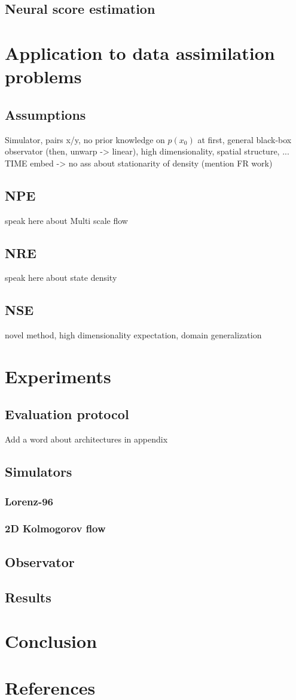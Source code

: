 \documentclass[a4paper, 12pt]{article}
\begin{document}
\subsection{Neural score estimation}

\section{Application to data assimilation problems}
\subsection{Assumptions}
Simulator, pairs x/y, no prior knowledge on $p(x_0)$ at first,
general black-box observator (then, unwarp -> linear), high dimensionality,
spatial structure, ... TIME embed -> no ass about stationarity of density (mention FR work)

\subsection{NPE}
speak here about Multi scale flow
\subsection{NRE}
speak here about state density 
\subsection{NSE}
novel method, high dimensionality expectation, domain generalization

\section{Experiments}
\subsection{Evaluation protocol}
Add a word about architectures in appendix
\subsection{Simulators}
\subsubsection{Lorenz-96}
\subsubsection{2D Kolmogorov flow}
\subsection{Observator}
\subsection{Results}

\section{Conclusion}

\section{References}
\end{document}
